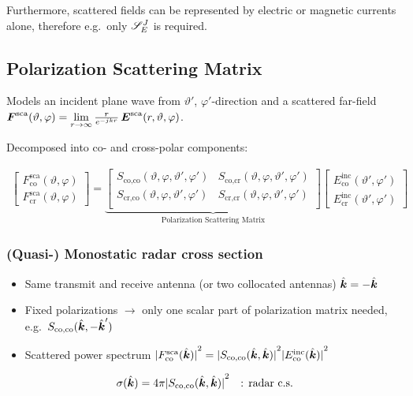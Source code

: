 Furthermore, scattered fields can be represented by electric or magnetic currents alone, therefore e.g.\ only $\DyadicS{E}{J}$ is required.

\subsection{Polarization Scattering Matrix}
Models an incident plane wave from $\vartheta'$, $\varphi'$-direction and a scattered far-field $\bs{F}^{\mathrm{sca}}(\vartheta, \varphi) = \lim\limits_{r\to\infty} \frac{r}{e^{-jkr}} \, \bs{E}^{\mathrm{sca}}(r, \vartheta, \varphi)$.

Decomposed into co- and cross-polar components:

\begin{align}
  \begin{bmatrix}
    F_{\text{co}}^{\text{sca}}(\vartheta, \varphi)\\
    F_{\text{cr}}^{\text{sca}}(\vartheta, \varphi)
  \end{bmatrix}
  =
  \underbrace{\begin{bmatrix}
    S_{\text{co,co}}(\vartheta,\varphi,\vartheta',\varphi') & S_{\text{co,cr}}(\vartheta,\varphi,\vartheta',\varphi')\\
    S_{\text{cr,co}}(\vartheta,\varphi,\vartheta',\varphi') & S_{\text{cr,cr}}(\vartheta,\varphi,\vartheta',\varphi')\\
  \end{bmatrix}}_{\text{Polarization Scattering Matrix}}
  \begin{bmatrix}
    E_{\text{co}}^{\text{inc}}(\vartheta',\varphi')\\
    E_{\text{cr}}^{\text{inc}}(\vartheta',\varphi')
  \end{bmatrix}
\end{align}

\subsubsection{(Quasi-) Monostatic radar cross section}
\begin{itemize}
        \item Same transmit and receive antenna (or two collocated antennas) $\hat{\bs{k}} = - \hat{\bs{k}}$
        \item Fixed polarizations $\to$ only one scalar part of polarization matrix needed, e.g.\ $S_{\text{co,co}}(\hat{\bs{k}}, -\hat{\bs{k}}')$
        \item Scattered power spectrum ${|F_{\text{co}}^{\text{sca}}(\hat{\bs{k}})|}^{2} = {|S_{\text{co,co}}(\hat{\bs{k}}, \hat{\bs{k}})|}^{2} {|E_{\text{co}}^{\text{inc}}(\hat{\bs{k}})|}^{2}$
\end{itemize}
\begin{equation}
  \sigma(\hat{\bs{k}}) = 4\pi {|S_{\text{co,co}}(\hat{\bs{k}}, \hat{\bs{k}})|}^{2} \quad \text{: radar c.s.}
\end{equation}

